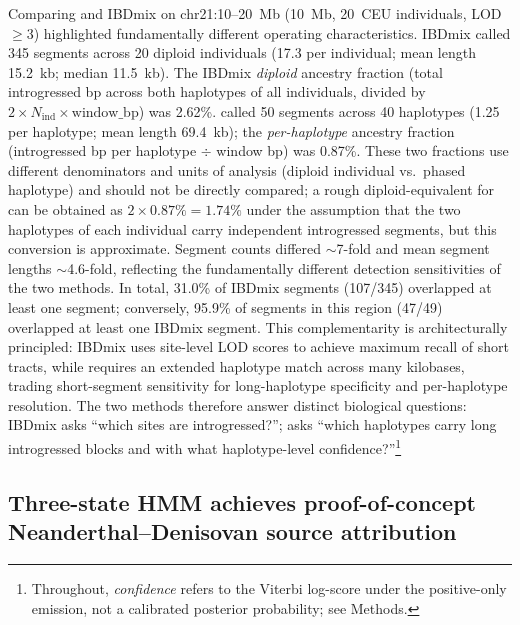 Comparing \AP{} and IBDmix on chr21:10--20~Mb (10~Mb, 20~CEU individuals, LOD $\geq 3$)
highlighted fundamentally different operating characteristics.
IBDmix called 345 segments across 20 diploid individuals (17.3 per individual;
mean length 15.2~kb; median 11.5~kb).
The IBDmix \emph{diploid} ancestry fraction (total introgressed bp across both
haplotypes of all individuals, divided by $2 \times N_\text{ind} \times
\text{window\_bp}$) was 2.62\%.
\AP{} called 50 segments across 40 haplotypes (1.25 per haplotype; mean length
69.4~kb); the \emph{per-haplotype} ancestry fraction
(introgressed bp per haplotype $\div$ window bp) was 0.87\%.
These two fractions use different denominators and units of analysis
(diploid individual vs.\ phased haplotype) and should not be directly compared;
a rough diploid-equivalent for \AP{} can be obtained as $2 \times 0.87\% = 1.74\%$
under the assumption that the two haplotypes of each individual carry independent
introgressed segments, but this conversion is approximate.
Segment counts differed $\sim$7-fold and mean segment lengths $\sim$4.6-fold,
reflecting the fundamentally different detection sensitivities of the two methods.
In total, 31.0\% of IBDmix segments (107/345) overlapped at least one \AP{} segment;
conversely, 95.9\% of \AP{} segments in this region (47/49) overlapped at least one IBDmix segment.
This complementarity is architecturally principled: IBDmix uses site-level
LOD scores to achieve maximum recall of short tracts, while \AP{} requires
an extended haplotype match across many kilobases, trading short-segment
sensitivity for long-haplotype specificity and per-haplotype resolution.
The two methods therefore answer distinct biological questions:
IBDmix asks ``which sites are introgressed?''; \AP{} asks ``which haplotypes
carry long introgressed blocks and with what haplotype-level confidence?''\footnote{Throughout, \emph{confidence} refers to the Viterbi log-score under the positive-only
emission, not a calibrated posterior probability; see Methods.}

\subsection*{Three-state HMM achieves proof-of-concept Neanderthal--Denisovan source attribution}

